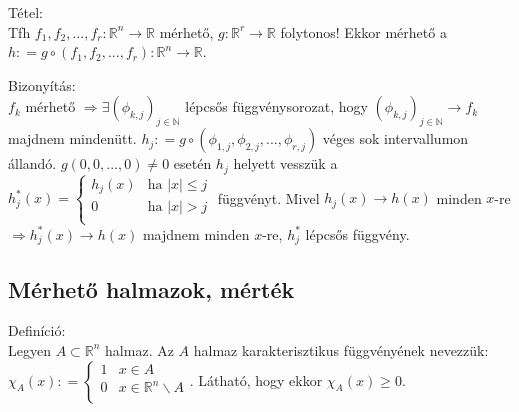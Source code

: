\documentclass[12pt,a4paper]{scrartcl}
\newenvironment{definicio}{}{}
\newenvironment{tetel}{}{}
\newenvironment{bizonyitas}{}{}
\begin{document}
\begin{tetel}

Tétel:\\
Tfh
\(\left. f_{1},f_{2},...,f_{r}:{\mathbb{R}}^{n}\rightarrow{\mathbb{R}} \right.\)
mérhető, \(\left. g:{\mathbb{R}}^{r}\rightarrow{\mathbb{R}} \right.\)
folytonos! Ekkor mérhető a
\(\left. h: = g \circ \left( {f_{1},f_{2},...,f_{r}} \right):{\mathbb{R}}^{n}\rightarrow{\mathbb{R}} \right.\).

\end{tetel}

\begin{bizonyitas}

Bizonyítás:\\
\(f_{k}\) mérhető
\(\left. \Rightarrow\exists\left( \phi_{k,j} \right)_{j \in {\mathbb{N}}} \right.\)
lépcsős függvénysorozat, hogy
\(\left. \left( \phi_{k,j} \right)_{j \in {\mathbb{N}}}\rightarrow f_{k} \right.\)
majdnem mindenütt.
\(h_{j}: = g \circ \left( {\phi_{1,j},\phi_{2,j},...,\phi_{r,j}} \right)\)
véges sok intervallumon állandó. \(g\left( 0,0,...,0 \right) \neq 0\)
esetén \(h_{j}\) helyett vesszük a
\(h_{j}^{\ast}\left( x \right) = \left\{ \begin{matrix} {h_{j}\left( x \right)} & {\text{ha~}\left| x \right| \leq j} \\ 0 & {\text{ha~}\left| x \right| > j} \\ \end{matrix} \right.\)
függvényt. Mivel
\(\left. h_{j}\left( x \right)\rightarrow h\left( x \right) \right.\)
minden \(x\)-re
\(\left. \Rightarrow h_{j}^{\ast}\left( x \right)\rightarrow h\left( x \right) \right.\)
majdnem minden \(x\)-re, \(h_{j}^{*}\) lépcsős függvény.

\end{bizonyitas}

\hypertarget{merheto-halmazok-mertek}{%
\subsection{Mérhető halmazok, mérték}\label{merheto-halmazok-mertek}}

\begin{definicio}

Definíció:\\
Legyen \(A \subset {\mathbb{R}}^{n}\) halmaz. Az \(A\) halmaz
karakterisztikus függvényének nevezzük:
\(\chi_{A}\left( x \right): = \left\{ \begin{matrix} 1 & {x \in A} \\ 0 & {x \in {\mathbb{R}}^{n}\backslash A} \\ \end{matrix} \right.\).
Látható, hogy ekkor \(\chi_{A}\left( x \right) \geq 0\).

\end{definicio}
\end{document}

